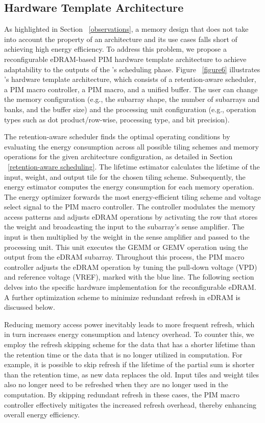 \subsection{Hardware Template Architecture}

As highlighted in Section ~\ref{observations}, a memory design that does not take into account the property of an architecture and its use cases falls short of achieving high energy efficiency. To address this problem, we propose a reconfigurable eDRAM-based PIM hardware template architecture to achieve adaptability to the outputs of the \sysname's scheduling phase. Figure ~\ref{figure6} illustrates \sysname’s hardware template architecture, which consists of a retention-aware scheduler, a PIM macro controller, a PIM macro, and a unified buffer. The user can change the memory configuration (e.g., the subarray shape, the number of subarrays and banks, and the buffer size) and the processing unit configuration (e.g., operation types such as dot product/row-wise, processing type, and bit precision).

The retention-aware scheduler finds the optimal operating conditions by evaluating the energy consumption across all possible tiling schemes and memory operations for the given architecture configuration, as detailed in Section ~\ref{retention-aware scheduling}. The lifetime estimator calculates the lifetime of the input, weight, and output tile for the chosen tiling scheme. Subsequently, the energy estimator computes the energy consumption for each memory operation. The energy optimizer forwards the most energy-efficient tiling scheme and voltage select signal to the PIM macro controller. The controller modulates the memory access patterns and adjusts eDRAM operations by activating the row that stores the weight and broadcasting the input to the subarray’s sense amplifier. The input is then multiplied by the weight in the sense amplifier and passed to the processing unit. This unit executes the GEMM or GEMV operation using the output from the eDRAM subarray. Throughout this process, the PIM macro controller adjusts the eDRAM operation by tuning the pull-down voltage (VPD) and reference voltage (VREF), marked with the blue line. The following section delves into the specific hardware implementation for the reconfigurable eDRAM. A further optimization scheme to minimize redundant refresh in eDRAM is discussed below.

Reducing memory access power inevitably leads to more frequent refresh, which in turn increases energy consumption and latency overhead. To counter this, we employ the refresh skipping scheme for the data that has a shorter lifetime than the retention time or the data that is no longer utilized in computation. For example, it is possible to skip refresh if the lifetime of the partial sum is shorter than the retention time, as new data replaces the old. Input tiles and weight tiles also no longer need to be refreshed when they are no longer used in the computation. By skipping redundant refresh in these cases, the PIM macro controller effectively mitigates the increased refresh overhead, thereby enhancing overall energy efficiency.

